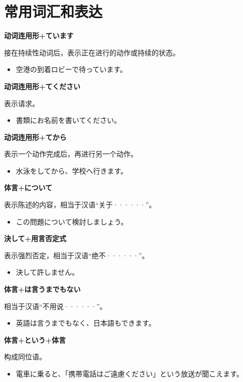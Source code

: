 \section{常用词汇和表达}%
\label{sec:exp}

{\bf
\noindent 动词连用形+ています
}

接在持续性动词后，表示正在进行的动作或持续的状态。
\begin{itemize}
  \item 空港の到着ロビーで待っています。
\end{itemize}

{\bf
\noindent 动词连用形+てください
}

表示请求。
\begin{itemize}
  \item 書類にお名前を書いてください。
\end{itemize}

{\bf
\noindent 动词连用形+てから
}

表示一个动作完成后，再进行另一个动作。
\begin{itemize}
  \item 水泳をしてから、学校へ行きます。
\end{itemize}

{\bf
\noindent 体言+について
}

表示陈述的内容，相当于汉语``关于······''。
\begin{itemize}
  \item この問題について検討しましょう。
\end{itemize}

{\bf
\noindent 決して+用言否定式
}

表示强烈否定，相当于汉语``绝不······''。
\begin{itemize}
  \item 決して許しません。
\end{itemize}

{\bf
\noindent 体言+は言うまでもない
}

相当于汉语``不用说······''。
\begin{itemize}
  \item 英語は言うまでもなく、日本語もできます。
\end{itemize}

{\bf
\noindent 体言+という+体言
}

构成同位语。
\begin{itemize}
  \item 電車に乗ると、「携帯電話はご遠慮ください」という放送が聞こえます。
\end{itemize}


